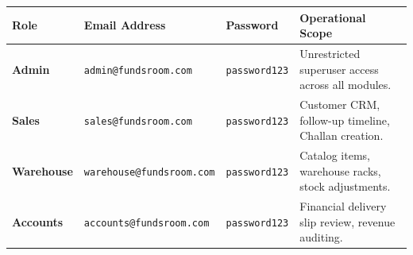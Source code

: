 \documentclass[11pt,a4paper]{article}
\begin{document}
\begin{table}[htbp]
\centering
\small
\begin{tabularx}{\textwidth}{l l l X}
\toprule
\textbf{Role} & \textbf{Email Address} & \textbf{Password} & \textbf{Operational Scope} \\
\midrule
\textbf{Admin} & \texttt{admin@fundsroom.com} & \texttt{password123} & Unrestricted superuser access across all modules. \\
\textbf{Sales} & \texttt{sales@fundsroom.com} & \texttt{password123} & Customer CRM, follow-up timeline, Challan creation. \\
\textbf{Warehouse} & \texttt{warehouse@fundsroom.com} & \texttt{password123} & Catalog items, warehouse racks, stock adjustments. \\
\textbf{Accounts} & \texttt{accounts@fundsroom.com} & \texttt{password123} & Financial delivery slip review, revenue auditing. \\
\bottomrule
\end{tabularx}
\end{table}
\end{document}
